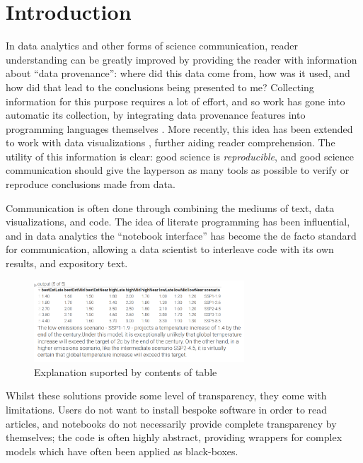 \section{Introduction}

In data analytics and other forms of science communication, reader understanding can
be greatly improved by providing the reader with information about ``data provenance'':
where did this data come from, how was it used, and how did that lead to the conclusions being presented to me?
Collecting information for this purpose requires a lot of effort, and so work has gone into automatic its collection,
by integrating data provenance features into programming languages themselves \cite{fehrenbach16}. More recently, this idea
has been extended to work with data visualizations \cite{perera22}, further aiding reader comprehension.
The utility of this information is clear: good science  is
\emph{reproducible}, and good science communication should give the layperson as many tools
as possible to verify or reproduce conclusions made from data.

Communication is often done through combining the mediums of text,
data visualizations, and code. The idea of literate programming \cite{knuth84} has
been influential, and in data analytics the ``notebook interface'' \cite{kluyver16} has become
the de facto standard for communication, allowing a data scientist to interleave code with its own results, and expository text. 

\begin{figure}[h]
   \includegraphics[width=0.7\textwidth]{fig/ipcc-table-explanation.png}
   \caption{Explanation suported by contents of table}
   \label{fig:table-explanation}
\end{figure}

Whilst these solutions provide some level of transparency, they come with limitations. Users do not want to 
install bespoke software in order to read articles, and notebooks do not necessarily provide complete
transparency by themselves; the code is often highly abstract, providing wrappers
for complex models which have often been applied as black-boxes.

